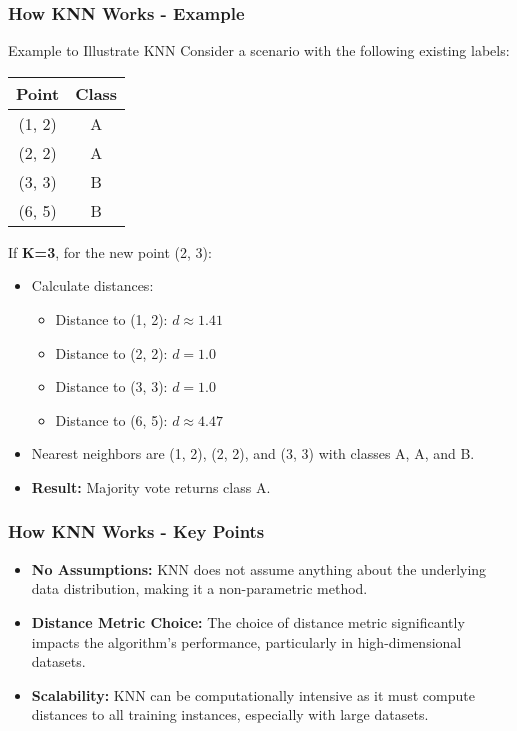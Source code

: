 \documentclass[aspectratio=169]{beamer}
\begin{document}
\begin{frame}[fragile]
    \frametitle{How KNN Works - Example}
    \begin{block}{Example to Illustrate KNN}
        Consider a scenario with the following existing labels:

        \begin{center}
        \begin{tabular}{|c|c|}
        \hline
        \textbf{Point} & \textbf{Class} \\
        \hline
        (1, 2) & A \\
        (2, 2) & A \\
        (3, 3) & B \\
        (6, 5) & B \\
        \hline
        \end{tabular}
        \end{center}
        
        If \textbf{K=3}, for the new point (2, 3):
        \begin{itemize}
            \item Calculate distances:  
            \begin{itemize}
                \item Distance to (1, 2): \( d \approx 1.41 \)
                \item Distance to (2, 2): \( d = 1.0 \)
                \item Distance to (3, 3): \( d = 1.0 \)
                \item Distance to (6, 5): \( d \approx 4.47 \)
            \end{itemize}
            \item Nearest neighbors are (1, 2), (2, 2), and (3, 3) with classes A, A, and B.
            \item \textbf{Result:} Majority vote returns class A.
        \end{itemize}
    \end{block}
\end{frame}

\begin{frame}[fragile]
    \frametitle{How KNN Works - Key Points}
    \begin{itemize}
        \item \textbf{No Assumptions:} KNN does not assume anything about the underlying data distribution, making it a non-parametric method.
        \item \textbf{Distance Metric Choice:} The choice of distance metric significantly impacts the algorithm's performance, particularly in high-dimensional datasets.
        \item \textbf{Scalability:} KNN can be computationally intensive as it must compute distances to all training instances, especially with large datasets.
    \end{itemize}
\end{frame}
\end{document}
